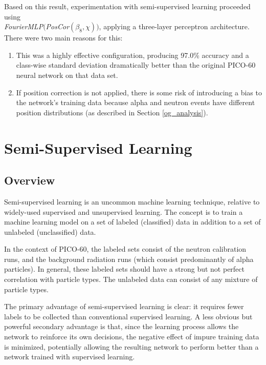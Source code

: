 \documentclass[10pt]{article}
\begin{document}
Based on this result, experimentation with semi-supervised learning proceeded using \\ {\it FourierMLP}$(${\it PosCor}$(\beta_{8}, \chi))$, applying a three-layer perceptron architecture. There were two main reasons for this:

\begin{enumerate}
    \item This was a highly effective configuration, producing 97.0\% accuracy and a class-wise standard deviation dramatically better than the original PICO-60 neural network on that data set.
    \item If position correction is not applied, there is some risk of introducing a bias to the network's training data because alpha and neutron events have different position distributions (as described in Section \ref{og_analysis}).
\end{enumerate}

\section{Semi-Supervised Learning} \label{semi_supervised}

\subsection{Overview}

Semi-supervised learning is an uncommon machine learning technique, relative to widely-used supervised and unsupervised learning. The concept is to train a machine learning model on a set of labeled (classified) data in addition to a set of unlabeled (unclassified) data.

In the context of PICO-60, the labeled sets consist of the neutron calibration runs, and the background radiation runs (which consist predominantly of alpha particles). In general, these labeled sets should have a strong but not perfect correlation with particle types. The unlabeled data can consist of any mixture of particle types.

The primary advantage of semi-supervised learning is clear: it requires fewer labels to be collected than conventional supervised learning. A less obvious but powerful secondary advantage is that, since the learning process allows the network to reinforce its own decisions, the negative effect of impure training data is minimized, potentially allowing the resulting network to perform better than a network trained with supervised learning.
\end{document}
